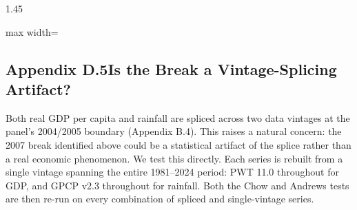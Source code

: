 \documentclass[12pt]{article}
\begin{document}
\begin{bibunit}[jpe]
\begin{spacing}{1.45}
\begin{table}[H]
\begin{adjustbox}{max width=\textwidth}
\begin{threeparttable}
\begin{tablenotes}[flushleft]
\end{tablenotes}
\end{threeparttable}
\end{adjustbox}
\end{table}

\subsection*{Appendix D.5\quad Is the Break a Vintage-Splicing Artifact?}

Both real GDP per capita and rainfall are spliced across two data vintages at the panel's 2004/2005 boundary (Appendix B.4). This raises a natural concern: the 2007 break identified above could be a statistical artifact of the splice rather than a real economic phenomenon. We test this directly. Each series is rebuilt from a single vintage spanning the entire 1981--2024 period: PWT 11.0 throughout for GDP, and GPCP v2.3 throughout for rainfall. Both the Chow and Andrews tests are then re-run on every combination of spliced and single-vintage series.


\end{spacing}
\end{bibunit}
\end{document}
